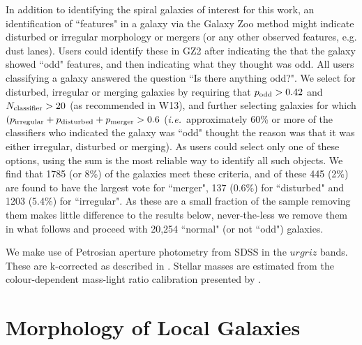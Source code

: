 \documentclass[usenatbib]{mn2e}
\newcommand{\ie}{{\it i.e.}}
\begin{document}
In addition to identifying the spiral galaxies of interest for this work, an identification of ``features" in a galaxy via the Galaxy Zoo method might indicate disturbed or irregular morphology or mergers (or any other observed features, e.g. dust lanes). Users could identify these in GZ2 after indicating the that the galaxy showed ``odd" features, and then indicating what they thought was odd. All users classifying a galaxy answered the question ``Is there anything odd?". We select for disturbed, irregular or merging galaxies by requiring that $p_{\rm odd} > 0.42$ and $N_{\rm classifier}>20$ (as recommended in W13), and further selecting galaxies for which $(p_{\rm irregular}+p_{\rm disturbed} + p_{\rm merger} > 0.6$ (\ie ~approximately 60\% or more of the classifiers who indicated the galaxy was ``odd" thought the reason was that it was either irregular, disturbed or merging). As users could select only one of these options, using the sum is the most reliable way to identify all such objects. We find that 1785 (or 8\%) of  the galaxies meet these criteria, and of these 445 (2\%) are found to have the largest vote for ``merger", 137 (0.6\%)  for ``disturbed" and 1203 (5.4\%) for ``irregular". As these are a small fraction of the sample removing them makes little difference to the results below, never-the-less we remove them in what follows and proceed with 20,254 ``normal" (or not ``odd") galaxies. 

We make use of Petrosian aperture photometry from SDSS in the $urgriz$ bands. These are k-corrected as described in \citet{Bamford2009}. Stellar masses are estimated from the colour-dependent mass-light ratio calibration presented by \citet{Baldry2008}. 

\section{Morphology of Local Galaxies} \label{demographics}

\end{document}
